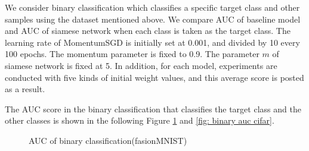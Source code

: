\documentclass[twocolumn,10pt]{article}
\begin{document}
We consider binary classification which classifies a specific target class and other samples using the dataset mentioned above.
We compare AUC of baseline model and AUC of siamese network when each class is taken as the target class.
The learning rate of MomentumSGD is initially set at 0.001, and divided by 10 every 100 epochs.
The momentum parameter is fixed to 0.9.
The parameter $m$ of siamese network is fixed at 5.
In addition, for each model, experiments are conducted with five kinds of initial weight values, and this average score is posted as a result. \par
The AUC score in the binary classification that classifies the target class and the other classes is shown in the following Figure \ref{fig: binary auc fasion} and \ref{fig: binary auc cifar}.
\begin{figure}[ht]
\begin{center}
\end{center}
\caption{AUC of binary classification(fasionMNIST)}
\label{fig: binary auc fasion}
\end{figure}
\end{document}
